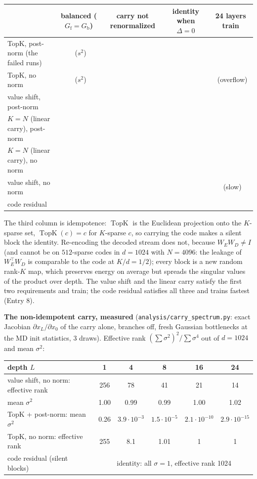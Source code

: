 \documentclass[11pt,a4paper]{article}
\newcommand{\code}[1]{\texttt{#1}}
\newcommand{\Gf}{G_{\mathrm{f}}}
\newcommand{\Gb}{G_{\mathrm{b}}}
\newcommand{\topk}{\operatorname{TopK}}
\newcommand{\ok}{\checkmark}
\newcommand{\fail}{\texttimes}
\begin{document}
\begin{center}\small
\begin{tabular}{lcccc}
\toprule
 & balanced (\(\Gf=\Gb\)) & carry not renormalized & identity when \(\Delta=0\) & 24 layers train \\
\midrule
TopK, post-norm (the failed runs)      & \fail\ (\(s^2\)) & \fail & \fail & \fail \\
TopK, no norm                          & \fail\ (\(s^2\)) & \ok   & \fail & \fail\ (overflow) \\
value shift, post-norm                 & \ok & \fail & \fail & \fail \\
\(K=N\) (linear carry), post-norm      & \ok & \fail & \fail & \fail \\
\(K=N\) (linear carry), no norm        & \ok & \ok   & \fail & \ok \\
value shift, no norm                   & \ok & \ok   & \fail & \ok\ (slow) \\
code residual                          & \ok & \ok   & \ok   & \ok \\
\bottomrule
\end{tabular}
\end{center}

The third column is idempotence: \(\topk\) is the Euclidean projection onto the
\(K\)-sparse set, \(\topk(c)=c\) for \(K\)-sparse \(c\), so carrying the code
makes a silent block the identity.  Re-encoding the decoded stream does not,
because \(W_EW_D\neq I\) (and cannot be on \(512\)-sparse codes in \(d=1024\)
with \(N=4096\): the leakage of \(W_E^\top W_D\) is comparable to the code at
\(K/d=1/2\)); every block is a new random rank-\(K\) map, which preserves
energy on average but spreads the singular values of the product over depth.
The value shift and the linear carry satisfy the first two requirements and
train; the code residual satisfies all three and trains fastest (Entry 8).

\textbf{The non-idempotent carry, measured} (\code{analysis/carry\_spectrum.py}:
exact Jacobian \(\partial x_L/\partial x_0\) of the carry alone, branches off,
fresh Gaussian bottlenecks at the MD init statistics, 3 draws).  Effective rank
\((\sum\sigma^2)^2/\sum\sigma^4\) out of \(d=1024\) and mean \(\sigma^2\):

\begin{center}\small
\begin{tabular}{lccccc}
\toprule
depth \(L\) & 1 & 4 & 8 & 16 & 24 \\
\midrule
value shift, no norm: effective rank & 256 & 78 & 41 & 21 & 14 \\
\phantom{value shift, no norm:} mean \(\sigma^2\) & 1.00 & 0.99 & 0.99 & 1.00 & 1.02 \\
TopK + post-norm: mean \(\sigma^2\) & 0.26 & \(3.9\cdot10^{-3}\) & \(1.5\cdot10^{-5}\) & \(2.1\cdot10^{-10}\) & \(2.9\cdot10^{-15}\) \\
TopK, no norm: effective rank & 255 & 8.1 & 1.01 & 1 & 1 \\
code residual (silent blocks) & \multicolumn{5}{c}{identity: all \(\sigma=1\), effective rank 1024} \\
\bottomrule
\end{tabular}
\end{center}
\end{document}

